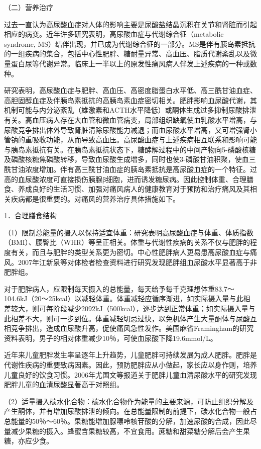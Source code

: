 （二）营养治疗

过去一直认为高尿酸血症对人体的影响主要是尿酸盐结晶沉积在关节和肾脏而引起相应的病变。近年许多研究表明，高尿酸血症与代谢综合征（metabolic
syndrome,
MS）结伴出现，并已成为代谢综合征的一部分。MS是伴有胰岛素抵抗的一组疾病的集合，包括中心性肥胖、糖耐量异常、高血压、脂质代谢紊乱以及微量蛋白尿等代谢异常。临床上一半以上的原发性痛风病人伴发上述疾病的一种或数种。

研究表明，高尿酸血症与肥胖、高血压、高密度脂蛋白水平低、高三酰甘油血症、高胆固醇血症及伴胰岛素抵抗的高胰岛素血症密切相关。肥胖影响血尿酸代谢，其机制可能与内分泌紊乱（雄激素和ACTH水平降低）或酮体生成过多抑制尿酸排泄有关。高血压病人存在大血管和微血管病变，局部组织缺氧使血乳酸水平增高，与尿酸竞争排出体外导致肾脏清除尿酸能力减退；而血尿酸水平增高，又可增强肾小管钠的重吸收功能，从而导致高血压。高尿酸血症与上述疾病相互联系和影响可能与胰岛素抵抗有关。在胰岛素抵抗状态下，糖酵解过程中的中间产物向5-磷酸核糖及磷酸核糖焦磷酸转移，导致血尿酸生成增多，同时也使3-磷酸甘油积聚，使血三酰甘油浓度增加。伴有高三酰甘油血症的胰岛素抵抗是高尿酸血症的一个特征。过高的血尿酸浓度可直接损伤胰腺β细胞，进而诱发糖尿病。因此控制体重、合理膳食、养成良好的生活习惯、加强对痛风病人的健康教育对于预防和治疗痛风及其相关疾病都是很重要的。对痛风的营养治疗具体措施如下。

{1．合理膳食结构}

（1）限制总能量的摄入以保持适宜体重：研究表明高尿酸血症与体重、体质指数（BMI）、腰臀比（WHR）等呈正相关。体重与代谢性疾病的关系不仅与肥胖的程度有关，而且与肥胖的类型关系更为密切。中心性肥胖病人更易患高尿酸血症与痛风。2007年江新泉等对体检者检查资料进行研究发现肥胖组血尿酸水平显著高于非肥胖组。

对于肥胖病人，应限制每天摄入的总能量，每天给予每千克理想体重83.7～104.6kJ（20～25kcal）以减轻体重。体重减轻应循序渐进，如实际摄入量与此相差较大，则可每阶段减少2092kJ（500kcal），逐步达到正常体重；如实际摄入量与此相差不大，则可一步到位。体重减轻切忌过快，以免机体产生大量酮体与尿酸互相竞争排出，造成血尿酸升高，促使痛风急性发作。美国麻省Framingham的研究资料表明，男子的相对体重减少10％，可使血尿酸下降19.6mmol/L。

近年来儿童肥胖发生率呈逐年上升趋势，儿童肥胖可持续发展为成人肥胖。肥胖是代谢性疾病的重要致病因素。因此，预防肥胖应从小做起，家长应以身作则，培养儿童良好的饮食习惯。2006年尤国文等报道关于肥胖儿童血清尿酸水平的研究发现肥胖儿童的血清尿酸显著高于对照组。

（2）适量摄入碳水化合物：碳水化合物作为能量的主要来源，可防止组织分解及产生酮体，并有增加尿酸排泄的倾向。在总能量限制的前提下，碳水化合物一般占总能量的50％～60％。果糖能增加腺嘌呤核苷酸的分解，加速尿酸的合成，因此尽量减少果糖的摄入。蜂蜜含果糖较高，不宜食用。蔗糖和甜菜糖分解后会产生果糖，亦应少食。

